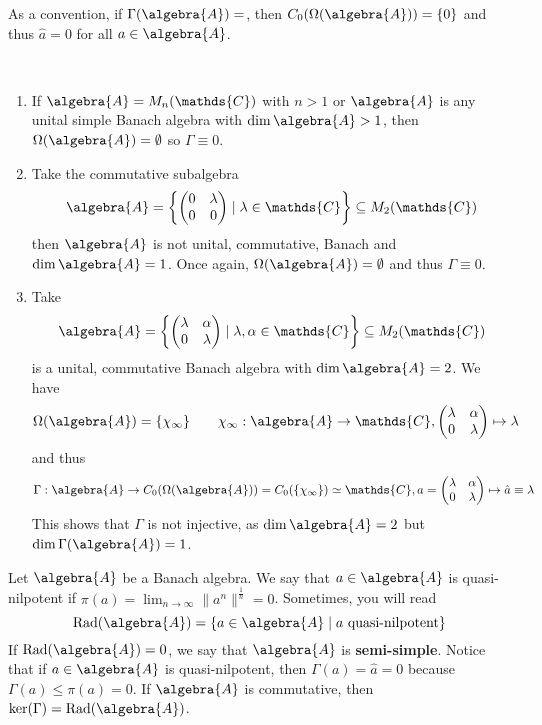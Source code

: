 \documentclass[a4paper]{article}
\begin{document}
As a convention, if $\Gamma(\algebra{A}) = \empty$, then $C_0(\Omega(\algebra{A})) = \{0\}$ and thus $\hat a = 0$ for all $a \in \algebra{A}$.

\begin{example}~
	\begin{enumerate}
		\item If $\algebra{A} = M_n(\mathds{C})$ with $n > 1$ or $\algebra{A}$ is any unital simple Banach algebra with $\dim \algebra{A} > 1$, then $\Omega(\algebra{A}) = \emptyset$ so $\Gamma \equiv 0$.
		\item Take the commutative subalgebra
		      \begin{equation*}
			      \algebra{A} = \left\{ \qmatrix{0 & \lambda \\ 0 & 0} \mid \lambda \in \mathds{C} \right\} \subseteq M_2(\mathds{C})
		      \end{equation*}
		      then $\algebra{A}$ is not unital, commutative, Banach and $\dim \algebra{A} = 1$. Once again, $\Omega(\algebra{A}) = \emptyset$ and thus $\Gamma \equiv 0$.
		\item Take
		      \begin{equation*}
			      \algebra{A} = \left\{ \qmatrix{\lambda & \alpha \\ 0 & \lambda} \mid \lambda, \alpha \in \mathds{C} \right\} \subseteq M_2(\mathds{C})
		      \end{equation*}
		      is a unital, commutative Banach algebra with $\dim \algebra{A} = 2$. We have
		      \begin{equation*}
			      \Omega(\algebra{A}) = \{\chi_\infty\} \qquad \chi_\infty: \algebra{A} \to \mathds{C},  \qmatrix{\lambda & \alpha \\ 0 & \lambda}  \mapsto \lambda
		      \end{equation*}
		      and thus
		      \begin{equation*}
			      \Gamma: \algebra{A} \to C_0(\Omega(\algebra{A})) = C_0(\{\chi_\infty\}) \simeq \mathds{C}, a = \qmatrix{\lambda & \alpha \\ 0 & \lambda} \mapsto \hat a \equiv \lambda
		      \end{equation*}
		      This shows that $\Gamma$ is not injective, as $\dim \algebra{A} = 2$ but $\dim \Gamma(\algebra{A}) = 1$.
	\end{enumerate}
\end{example}

\begin{definition}
	Let $\algebra{A}$ be a Banach algebra. We say that $a \in \algebra{A}$ is quasi-nilpotent if $\pi(a) = \lim_{n \to \infty} \|a^n\|^{\frac{1}{n}} = 0$.
	Sometimes, you will read
	\begin{equation*}
		\mathrm{Rad}(\algebra{A})  = \{a \in \algebra{A} \mid a \text{ quasi-nilpotent}\}
	\end{equation*}
	If $\mathrm{Rad}(\algebra{A}) = 0$, we say that $\algebra{A}$ is \textbf{semi-simple}.
	Notice that if $a \in \algebra{A}$ is quasi-nilpotent, then $\Gamma(a) = \hat a = 0$ because $\Gamma(a) \leq \pi(a) = 0$.
	If $\algebra{A}$ is commutative, then $\ker(\Gamma) = \mathrm{Rad}(\algebra{A})$.
\end{definition}
\end{document}
